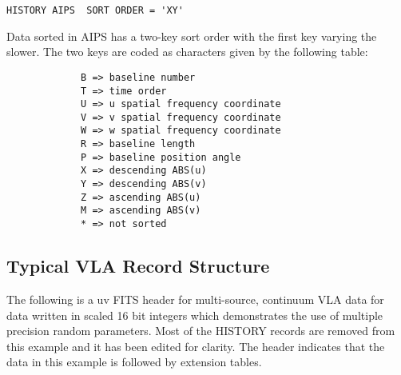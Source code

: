 \begin{verbatim}
HISTORY AIPS  SORT ORDER = 'XY'

\end{verbatim}
Data sorted in AIPS has a two-key sort order with the first key
varying the slower.  The two keys are coded as characters given by
the following table:

\begin{verbatim}
             B => baseline number
             T => time order
             U => u spatial frequency coordinate
             V => v spatial frequency coordinate
             W => w spatial frequency coordinate
             R => baseline length
             P => baseline position angle
             X => descending ABS(u)
             Y => descending ABS(v)
             Z => ascending ABS(u)
             M => ascending ABS(v)
             * => not sorted

\end{verbatim}

\subsection{Typical VLA Record Structure }
The following is a uv FITS header for multi-source, continuum VLA data
for data written in scaled 16 bit integers which demonstrates the use
of multiple precision random parameters.  Most of the HISTORY records
are removed from this example and it has been edited for clarity.  The
header indicates that the data in this example is followed by
extension tables.

